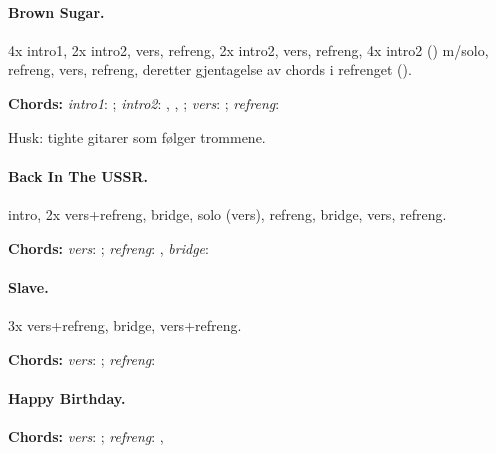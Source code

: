\documentclass[%
twoside,                 %
final,                   %
10pt]{article}
\begin{document}
\paragraph{Brown Sugar.}
4x intro1, 2x intro2, vers, refreng, 2x intro2, vers, refreng, 4x intro2 () m/solo, refreng, vers, refreng, deretter gjentagelse av chords i refrenget ().

\textbf{Chords:} \emph{intro1}: ; \emph{intro2}: , , ;
\emph{vers}: ; \emph{refreng}: 

Husk: tighte gitarer som følger trommene.




\paragraph{Back In The USSR.}
intro, 2x vers+refreng, bridge, solo (vers), refreng, bridge, vers, refreng.

\textbf{Chords:} \emph{vers}: ; \emph{refreng}: ,
\emph{bridge}: 





\paragraph{Slave.}
3x vers+refreng, bridge, vers+refreng.

\textbf{Chords:} \emph{vers}: ; \emph{refreng}: 




\paragraph{Happy Birthday.}
\textbf{Chords:} \emph{vers}: ; \emph{refreng}: , 









\printindex
\end{document}
